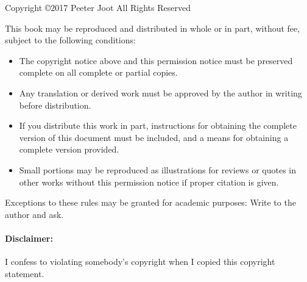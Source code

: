 


Copyright \copyright 2017 Peeter Joot
All Rights Reserved

This book may be reproduced and distributed in whole or in part, without fee, subject to the following conditions:

\begin{itemize}\item The copyright notice above and this permission notice must be preserved complete on all complete or partial copies.

\item Any translation or derived work must be approved by the author in writing before distribution.

\item If you distribute this work in part, instructions for obtaining the complete version of this document must be included, and a means for obtaining a complete version provided.

\item Small portions may be reproduced as illustrations for reviews or quotes in other works without this permission notice if proper citation is given.
\end{itemize}

Exceptions to these rules may be granted for academic purposes: Write to the author and ask.

\paragraph{Disclaimer:} I confess to violating somebody's copyright when I copied this copyright statement.
